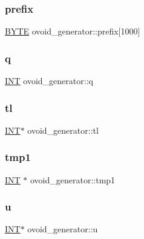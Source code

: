 \subsubsection{\texorpdfstring{prefix}{prefix}}
{\footnotesize\ttfamily \mbox{\hyperlink{galois_8h_ab6cc7b4aeb6ea31aba2b3fbfc83ff5e6}{B\+Y\+TE}} ovoid\+\_\+generator\+::prefix\mbox{[}1000\mbox{]}}

\mbox{\label{classovoid__generator_a234ea6e3f5c5f522ff87768bfd3bdbd5}} 
\subsubsection{\texorpdfstring{q}{q}}
{\footnotesize\ttfamily \mbox{\hyperlink{galois_8h_a09fddde158a3a20bd2dcadb609de11dc}{I\+NT}} ovoid\+\_\+generator\+::q}

\mbox{\label{classovoid__generator_aca49a5809df7dcafcda82ba0df3ccea4}} 
\subsubsection{\texorpdfstring{tl}{tl}}
{\footnotesize\ttfamily \mbox{\hyperlink{galois_8h_a09fddde158a3a20bd2dcadb609de11dc}{I\+NT}}$\ast$ ovoid\+\_\+generator\+::tl}

\mbox{\label{classovoid__generator_ae518b0e0d281ba988b70167a622f112f}} 
\subsubsection{\texorpdfstring{tmp1}{tmp1}}
{\footnotesize\ttfamily \mbox{\hyperlink{galois_8h_a09fddde158a3a20bd2dcadb609de11dc}{I\+NT}} $\ast$ ovoid\+\_\+generator\+::tmp1}

\mbox{\label{classovoid__generator_aff25630d1357ebc734201c3964d0277d}} 
\subsubsection{\texorpdfstring{u}{u}}
{\footnotesize\ttfamily \mbox{\hyperlink{galois_8h_a09fddde158a3a20bd2dcadb609de11dc}{I\+NT}}$\ast$ ovoid\+\_\+generator\+::u}

